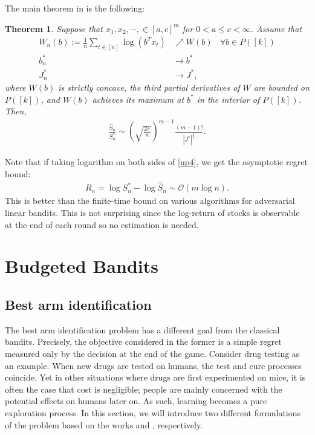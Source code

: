 \documentclass[10pt, openright]{book}
\numberwithin{equation}{section}
\theoremstyle{plain}
\newtheorem{Th}{Theorem}[section]
\theoremstyle{definition}
\begin{document}
The main theorem in \cite{cover2011universal} is the following:
\begin{Th}
Suppose that $x_1, x_2, \cdots, \in [a, c]^m$ for $0<a\leq c<\infty$. Assume that 
\begin{align*}
W_n(b):=\frac{1}{n}\sum_{t\in [n]}\log(b^Tx_t)&\nearrow W(b)\ \ \ \ \forall b\in P([k])\\
b_n^*&\to b^*\\
J_n^*&\to J^*,
\end{align*}
where $W(b)$ is strictly concave, the third partial derivatives of $W$ are bounded on $P([k])$, and $W(b)$ achieves its maximum at $b^*$ in the interior of $P([k])$. Then,
\begin{align}
\frac{\hat{S}_n}{S_n^*}\sim\left(\sqrt{\frac{2\pi}{n}}\right)^{m-1}\frac{(m-1)!}{|J^*|^{\frac{1}{2}}}.\label{up4}
\end{align}
\end{Th}
Note that if taking logarithm on both sides of \eqref{up4}, we get the asymptotic regret bound:
\begin{align*}
R_n = \log S_n^*-\log\hat{S}_n\sim \mathcal O\left(m\log n\right). 
\end{align*}
This is better than the finite-time bound on various algorithms for adversarial linear bandits. This is not surprising since the log-return of stocks is observable at the end of each round so no estimation is needed. 


\chapter{Budgeted Bandits}
\section{Best arm identification}
The best arm identification problem has a different goal from the classical bandits. Precisely, the objective considered in the former is a simple regret measured only by the decision at the end of the game. Consider drug testing as an example. When new drugs are tested on humans, the test and cure processes coincide. Yet in other situations where drugs are first experimented on mice, it is often the case that cost is negligible; people are mainly concerned with the potential effects on humans later on. As such, learning becomes a pure exploration process. In this section, we will introduce two different formulations of the problem based on the works \cite{audibert2010best,  bubeck2009pure} and \cite{garivier2016optimal}, respectively. 
\end{document}
